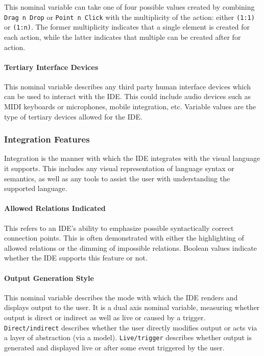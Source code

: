 This nominal variable can take one of four possible values created by
combining \texttt{Drag n Drop} or \texttt{Point n Click} with the
multiplicity of the action: either \texttt{(1:1)} or \texttt{(1:n)}. The
former multiplicity indicates that a single element is created for each
action, while the latter indicates that multiple can be created after for
action.


\paragraph{Tertiary Interface Devices} This nominal variable describes any
third party human interface devices which can be used to interact with the
IDE. This could include audio devices such as MIDI keyboards or
microphones, mobile integration, etc. Variable values are the type of
tertiary devices allowed for the IDE.


\subsubsection{Integration Features} \label{subsubsec:integration}

Integration is the manner with which the IDE integrates with the visual
language it supports. This includes any visual representation of language
syntax or semantics, as well as any tools to assist the user with
understanding the supported language.


\paragraph{Allowed Relations Indicated} This refers to an IDE's ability to
emphasize possible syntactically correct connection points. This is often
demonstrated with either the highlighting of allowed relations or the
dimming of impossible relations. Boolean values indicate whether the IDE
supports this feature or not.


\paragraph{Output Generation Style} This nominal variable describes the
mode with which the IDE renders and displays output to the user. It is a
dual axis nominal variable, measuring whether output is direct or indirect
as well as live or caused by a trigger. \texttt{Direct/indirect} describes
whether the user directly modifies output or acts via a layer of
abstraction (\eg via a model). \texttt{Live/trigger} describes whether
output is generated and displayed live or after some event triggered by the
user.


